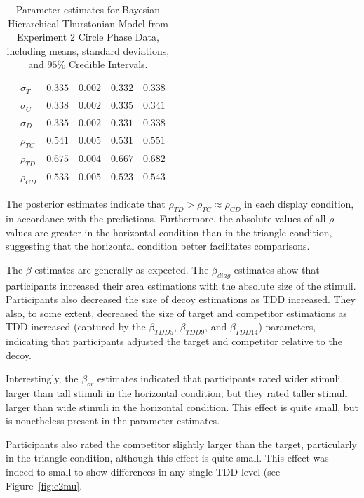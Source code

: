 \begin{table}[ht]
\begin{tabular}{llrrrr}
                    &  $\sigma_{T}$    &    $0.335$   &   $0.002$   &  $0.332$     & $0.338$     \\
                    &  $\sigma_{C}$    &    $0.338$   &   $0.002$   &  $0.335$     & $0.341$     \\
                    &  $\sigma_{D}$    &    $0.335$   &   $0.002$   &  $0.331$     & $0.338$     \\
                    &  $\rho_{TC}$     &    $0.541$   &   $0.005$   &  $0.531$     & $0.551$     \\
                    &  $\rho_{TD}$     &    $0.675$   &   $0.004$   &  $0.667$     & $0.682$     \\
                    &  $\rho_{CD}$     &    $0.533$   &   $0.005$   &  $0.523$     & $0.543$     \\
        \bottomrule
    \end{tabular}
    \caption{Parameter estimates for Bayesian Hierarchical Thurstonian Model from Experiment 2 Circle Phase Data, including means, standard deviations, and $95\%$ Credible Intervals.}
    \label{tab:e2_params}
\end{table}

The posterior estimates indicate that $\rho_{TD}>\rho_{TC}\approx\rho_{CD}$ in each display condition, in accordance with the predictions. Furthermore, the absolute values of all $\rho$ values are greater in the horizontal condition than in the triangle condition, suggesting that the horizontal condition better facilitates comparisons. 

The $\beta$ estimates are generally as expected. The $\beta_{diag}$ estimates show that participants increased their area estimations with the absolute size of the stimuli. Participants also decreased the size of decoy estimations as TDD increased. They also, to some extent, decreased the size of target and competitor estimations as TDD increased (captured by the $\beta_{TDD5}$, $\beta_{TDD9}$, and $\beta_{TDD14}$) parameters, indicating that participants adjusted the target and competitor relative to the decoy.

Interestingly, the $\beta_{or}$ estimates indicated that participants rated wider stimuli larger than tall stimuli in the horizontal condition, but they rated taller stimuli larger than wide stimuli in the horizontal condition. This effect is quite small, but is nonetheless present in the parameter estimates.

Participants also rated the competitor slightly larger than the target, particularly in the triangle condition, although this effect is quite small. This effect was indeed to small to show differences in any single TDD level (see Figure~\ref{fig:e2mu}. 

